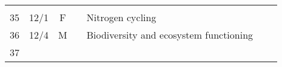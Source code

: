 \documentclass[]{article}
\begin{document}
\begin{longtable}[]{@{}cccllll@{}}
\begin{minipage}[t]{0.16\columnwidth}
\strut
\end{minipage}\tabularnewline
\begin{minipage}[t]{0.12\columnwidth}\centering\strut
35\strut
\end{minipage} & \begin{minipage}[t]{0.08\columnwidth}\centering\strut
12/1\strut
\end{minipage} & \begin{minipage}[t]{0.07\columnwidth}\centering\strut
F\strut
\end{minipage} & \begin{minipage}[t]{0.10\columnwidth}\raggedright\strut
\strut
\end{minipage} & \begin{minipage}[t]{0.11\columnwidth}\raggedright\strut
Nitrogen cycling\strut
\end{minipage} & \begin{minipage}[t]{0.11\columnwidth}\raggedright\strut
\strut
\end{minipage} & \begin{minipage}[t]{0.16\columnwidth}\raggedright\strut
\strut
\end{minipage}\tabularnewline
\begin{minipage}[t]{0.12\columnwidth}\centering\strut
36\strut
\end{minipage} & \begin{minipage}[t]{0.08\columnwidth}\centering\strut
12/4\strut
\end{minipage} & \begin{minipage}[t]{0.07\columnwidth}\centering\strut
M\strut
\end{minipage} & \begin{minipage}[t]{0.10\columnwidth}\raggedright\strut
\strut
\end{minipage} & \begin{minipage}[t]{0.11\columnwidth}\raggedright\strut
Biodiversity and ecosystem functioning\strut
\end{minipage} & \begin{minipage}[t]{0.11\columnwidth}\raggedright\strut
\strut
\end{minipage} & \begin{minipage}[t]{0.16\columnwidth}\raggedright\strut
\strut
\end{minipage}\tabularnewline
\begin{minipage}[t]{0.12\columnwidth}\centering\strut
37\strut
\end{minipage} & \begin{minipage}[t]{0.08\columnwidth}\centering\strut

\end{minipage}
\end{longtable}
\end{document}
